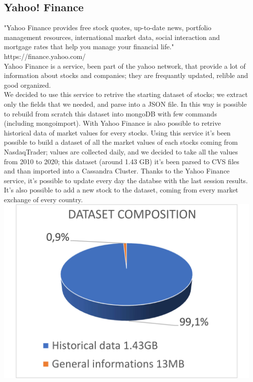 \subsection{Yahoo! Finance}
"Yahoo Finance provides free stock quotes, up-to-date news, portfolio management resources, 
international market data, social interaction and mortgage rates that help you manage your 
financial life." https://finance.yahoo.com/ \\
Yahoo Finance is a service, been part of the yahoo network, that provide a lot of information
about stocks and companies; they are frequantly updated, relible and good organized.\\
We decided to use this service to retrive the starting dataset of stocks; we extract only 
the fields that we needed, and parse into a JSON file. In this way 
is possible to rebuild from scratch this dataset into mongoDB with few commands (including
mongoimport).
With Yahoo Finance is also possible to retrive historical data of market values for every 
stocks. Using this service it's been possible to build a dataset of all the market values of
each stocks coming from NasdaqTrader; values are collected daily, and we decided to take all 
the values from 2010 to 2020; this dataset (around 1.43 GB) it's been parsed to CVS files and
than imported into a Cassandra Cluster. Thanks to the Yahoo Finance service, it's possible
to update every day the databse with the last session results. It's also possible to add a new
stock to the dataset, coming from every market exchange of every country.\\
\includegraphics[scale=0.12]{img/dataset_comp.png}\\


